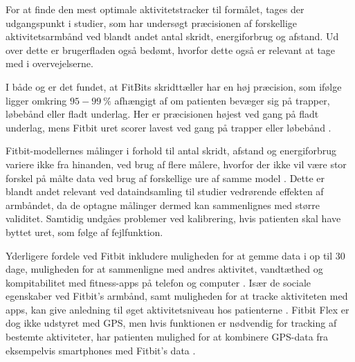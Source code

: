For at finde den mest optimale aktivitetstracker til formålet, tages der udgangspunkt i studier, som har undersøgt præcisionen af forskellige aktivitetsarmbånd ved blandt andet antal skridt, energiforbrug og afstand. Ud over dette er brugerfladen også bedømt, hvorfor dette også er relevant at tage med i overvejelserne.

I både \citep{evenson2015} og \citep{kaewkannate2016} er det fundet, at FitBits skridttæller har en høj præcision, som ifølge \citep{kaewkannate2016} ligger omkring  $95-99~\%$ afhængigt af om patienten bevæger sig på trapper, løbebånd eller fladt underlag. Her er præcisionen højest ved gang på fladt underlag, mens Fitbit uret scorer lavest ved gang på trapper eller løbebånd \citep{kaewkannate2016}.

Fitbit-modellernes målinger i forhold til antal skridt, afstand og energiforbrug variere ikke fra hinanden, ved brug af flere målere, hvorfor der ikke vil være stor forskel på målte data ved brug af forskellige ure af samme model \citep{evenson2015}. Dette er blandt andet relevant ved dataindsamling til studier vedrørende effekten af armbåndet, da de optagne målinger dermed kan sammenlignes med større validitet. Samtidig undgåes problemer ved kalibrering, hvis patienten skal have byttet uret, som følge af fejlfunktion.

Yderligere fordele ved Fitbit inkludere muligheden for at gemme data i op til $30$ dage, muligheden for at sammenligne med andres aktivitet, vandtæthed og kompitabilitet med fitness-apps på telefon og computer \citep{kaewkannate2016, fitbitflex}. Især de sociale egenskaber ved Fitbit's armbånd, samt muligheden for at tracke aktiviteten med apps, kan give anledning til øget aktivitetsniveau hos patienterne \citep{karapanos2016, rooksby2014}. Fitbit Flex er dog ikke udstyret med GPS, men hvis funktionen er nødvendig for tracking af bestemte aktiviteter, har patienten mulighed for at kombinere GPS-data fra eksempelvis smartphones med Fitbit's data \citep{fitbitflex}.